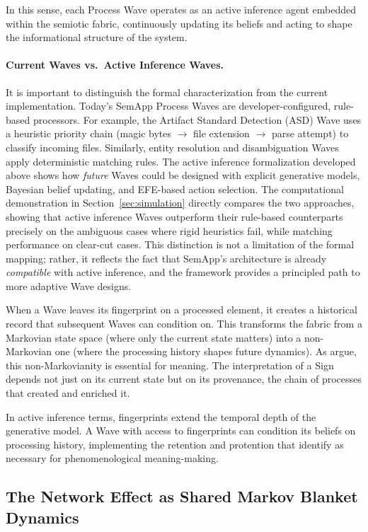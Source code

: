 \documentclass[11pt,a4paper]{article}
\theoremstyle{definition}
\begin{document}
In this sense, each Process Wave operates as an active inference agent embedded within the semiotic fabric, continuously updating its beliefs and acting to shape the informational structure of the system.

\paragraph{Current Waves vs.\ Active Inference Waves.} It is important to distinguish the formal characterization from the current implementation. Today's SemApp Process Waves are developer-configured, rule-based processors. For example, the Artifact Standard Detection (ASD) Wave uses a heuristic priority chain (magic bytes $\to$ file extension $\to$ parse attempt) to classify incoming files. Similarly, entity resolution and disambiguation Waves apply deterministic matching rules. The active inference formalization developed above shows how \emph{future} Waves could be designed with explicit generative models, Bayesian belief updating, and EFE-based action selection. The computational demonstration in Section~\ref{sec:simulation} directly compares the two approaches, showing that active inference Waves outperform their rule-based counterparts precisely on the ambiguous cases where rigid heuristics fail, while matching performance on clear-cut cases. This distinction is not a limitation of the formal mapping; rather, it reflects the fact that SemApp's architecture is already \emph{compatible} with active inference, and the framework provides a principled path to more adaptive Wave designs.

When a Wave leaves its fingerprint on a processed element, it creates a historical record that subsequent Waves can condition on. This transforms the fabric from a Markovian state space (where only the current state matters) into a non-Markovian one (where the processing history shapes future dynamics). As \citet{albarracin2025nonmarkovian} argue, this non-Markovianity is essential for meaning. The interpretation of a Sign depends not just on its current state but on its provenance, the chain of processes that created and enriched it.

In active inference terms, fingerprints extend the temporal depth of the generative model. A Wave with access to fingerprints can condition its beliefs on processing history, implementing the retention and protention that \citet{albarracin2025nonmarkovian} identify as necessary for phenomenological meaning-making.


\subsection{The Network Effect as Shared Markov Blanket Dynamics}
\label{sec:network}
\end{document}
